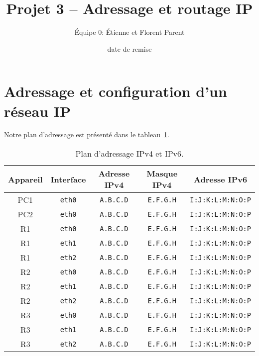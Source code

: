 \documentclass[]{article}
\title{Projet 3 -- Adressage et routage IP}
\author{Équipe 0: Étienne et Florent Parent} %
\date{date de remise} %
\begin{document}
\maketitle

\section*{Adressage et configuration d'un réseau IP}

Notre plan d'adressage est présenté dans le tableau~\ref{tab:plan-adressage}.


\begin{center}
      \begin{table}
            \begin{tabular}{ c c c c c }
                  \toprule
                  \textbf{Appareil} & \textbf{Interface} & \textbf{Adresse IPv4} & \textbf{Masque IPv4} & \textbf{Adresse IPv6}\\
                  \toprule
                  PC1 & \texttt{eth0} & \texttt{A.B.C.D} & \texttt{E.F.G.H} & \texttt{I:J:K:L:M:N:O:P}\\
                  \midrule
                  PC2 & \texttt{eth0} & \texttt{A.B.C.D} & \texttt{E.F.G.H} & \texttt{I:J:K:L:M:N:O:P}\\
                  \midrule
                  R1 & \texttt{eth0} & \texttt{A.B.C.D} & \texttt{E.F.G.H} & \texttt{I:J:K:L:M:N:O:P}\\
                  R1 & \texttt{eth1} & \texttt{A.B.C.D} & \texttt{E.F.G.H} & \texttt{I:J:K:L:M:N:O:P}\\
                  R1 & \texttt{eth2} & \texttt{A.B.C.D} & \texttt{E.F.G.H} & \texttt{I:J:K:L:M:N:O:P}\\
                  \midrule
                  R2 & \texttt{eth0} & \texttt{A.B.C.D} & \texttt{E.F.G.H} & \texttt{I:J:K:L:M:N:O:P}\\
                  R2 & \texttt{eth1} & \texttt{A.B.C.D} & \texttt{E.F.G.H} & \texttt{I:J:K:L:M:N:O:P}\\
                  R2 & \texttt{eth2} & \texttt{A.B.C.D} & \texttt{E.F.G.H} & \texttt{I:J:K:L:M:N:O:P}\\
                  \midrule
                  R3 & \texttt{eth0} & \texttt{A.B.C.D} & \texttt{E.F.G.H} & \texttt{I:J:K:L:M:N:O:P}\\
                  R3 & \texttt{eth1} & \texttt{A.B.C.D} & \texttt{E.F.G.H} & \texttt{I:J:K:L:M:N:O:P}\\
                  R3 & \texttt{eth2} & \texttt{A.B.C.D} & \texttt{E.F.G.H} & \texttt{I:J:K:L:M:N:O:P}\\
            \end{tabular}
            \caption{Plan d'adressage IPv4 et IPv6.}
            \label{tab:plan-adressage}
      \end{table}
\end{center}
\end{document}
